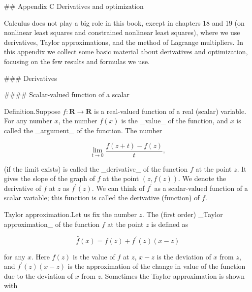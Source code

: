 

## Appendix C Derivatives and optimization

Calculus does not play a big role in this book, except in chapters 18 and 19 (on nonlinear least squares and constrained nonlinear least squares), where we use derivatives, Taylor approximations, and the method of Lagrange multipliers. In this appendix we collect some basic material about derivatives and optimization, focusing on the few results and formulas we use.

### Derivatives

#### Scalar-valued function of a scalar

Definition.Suppose \(f:\mathbf{R}\rightarrow\mathbf{R}\) is a real-valued function of a real (scalar) variable. For any number \(x\), the number \(f(x)\) is the _value_ of the function, and \(x\) is called the _argument_ of the function. The number

\[\lim_{t\to 0}\frac{f(z+t)-f(z)}{t},\]

(if the limit exists) is called the _derivative_ of the function \(f\) at the point \(z\). It gives the slope of the graph of \(f\) at the point \((z,f(z))\). We denote the derivative of \(f\) at \(z\) as \(f^{\prime}(z)\). We can think of \(f^{\prime}\) as a scalar-valued function of a scalar variable; this function is called the derivative (function) of \(f\).

Taylor approximation.Let us fix the number \(z\). The (first order) _Taylor approximation_ of the function \(f\) at the point \(z\) is defined as

\[\hat{f}(x)=f(z)+f^{\prime}(z)(x-z)\]

for any \(x\). Here \(f(z)\) is the value of \(f\) at \(z\), \(x-z\) is the deviation of \(x\) from \(z\), and \(f^{\prime}(z)(x-z)\) is the approximation of the change in value of the function due to the deviation of \(x\) from \(z\). Sometimes the Taylor approximation is shown with